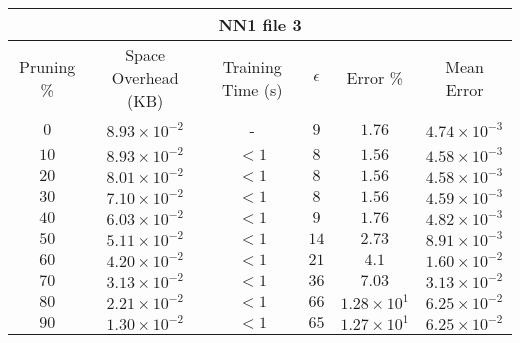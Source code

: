 \begin{adjustwidth}{0cm}{}
\begin{tabular}{cccccc}
\hline
\multicolumn{6}{c}{NN1 file 3} \\
\toprule
Pruning \% & Space Overhead (KB) & Training Time (s) & $\epsilon$ & Error \% & Mean Error\\
\midrule
$0$ & $8.93 \times 10^{-2}$ & - & $9$ & $1.76$ & $4.74 \times 10^{-3}$\\
$10$ & $8.93 \times 10^{-2}$ & $<1$ & $8$ & $1.56$ & $4.58 \times 10^{-3}$\\
$20$ & $8.01 \times 10^{-2}$ & $<1$ & $8$ & $1.56$ & $4.58 \times 10^{-3}$\\
$30$ & $7.10 \times 10^{-2}$ & $<1$ & $8$ & $1.56$ & $4.59 \times 10^{-3}$\\
$40$ & $6.03 \times 10^{-2}$ & $<1$ & $9$ & $1.76$ & $4.82 \times 10^{-3}$\\
$50$ & $5.11 \times 10^{-2}$ & $<1$ & $14$ & $2.73$ & $8.91 \times 10^{-3}$\\
$60$ & $4.20 \times 10^{-2}$ & $<1$ & $21$ & $4.1$ & $1.60 \times 10^{-2}$\\
$70$ & $3.13 \times 10^{-2}$ & $<1$ & $36$ & $7.03$ & $3.13 \times 10^{-2}$\\
$80$ & $2.21 \times 10^{-2}$ & $<1$ & $66$ & $1.28 \times 10^{1}$ & $6.25 \times 10^{-2}$\\
$90$ & $1.30 \times 10^{-2}$ & $<1$ & $65$ & $1.27 \times 10^{1}$ & $6.25 \times 10^{-2}$\\
\bottomrule
\end{tabular}
\end{adjustwidth}

\par\null\par
\par\null\par

